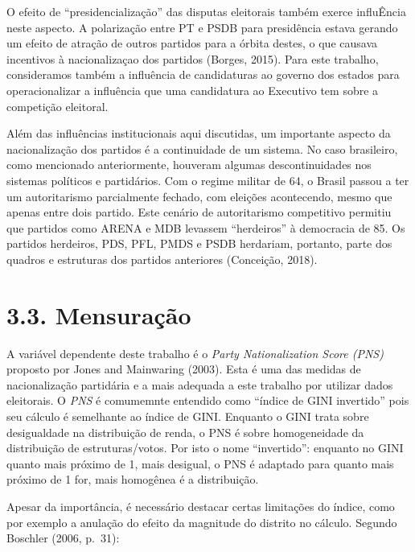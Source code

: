 \documentclass[]{article}
\begin{document}
O efeito de ``presidencialização'' das disputas eleitorais também exerce
influÊncia neste aspecto. A polarização entre PT e PSDB para presidência
estava gerando um efeito de atração de outros partidos para a órbita
destes, o que causava incentivos à nacionalizaçao dos partidos (Borges,
2015). Para este trabalho, consideramos também a influência de
candidaturas ao governo dos estados para operacionalizar a influência
que uma candidatura ao Executivo tem sobre a competição eleitoral.

Além das influências institucionais aqui discutidas, um importante
aspecto da nacionalização dos partidos é a continuidade de um sistema.
No caso brasileiro, como mencionado anteriormente, houveram algumas
descontinuidades nos sistemas políticos e partidários. Com o regime
militar de 64, o Brasil passou a ter um autoritarismo parcialmente
fechado, com eleições acontecendo, mesmo que apenas entre dois partido.
Este cenário de autoritarismo competitivo permitiu que partidos como
ARENA e MDB levassem ``herdeiros'' à democracia de 85. Os partidos
herdeiros, PDS, PFL, PMDS e PSDB herdariam, portanto, parte dos quadros
e estruturas dos partidos anteriores (Conceição, 2018).

\section{3.3. Mensuração}\label{mensuracao}

A variável dependente deste trabalho é o \emph{Party Nationalization
Score (PNS)} proposto por Jones and Mainwaring (2003). Esta é uma das
medidas de nacionalização partidária e a mais adequada a este trabalho
por utilizar dados eleitorais. O \emph{PNS} é comumemnte entendido como
``índice de GINI invertido'' pois seu cálculo é semelhante ao índice de
GINI. Enquanto o GINI trata sobre desigualdade na distribuição de renda,
o PNS é sobre homogeneidade da distribuição de estruturas/votos. Por
isto o nome ``invertido'': enquanto no GINI quanto mais próximo de 1,
mais desigual, o PNS é adaptado para quanto mais próximo de 1 for, mais
homogênea é a distribuição.

Apesar da importância, é necessário destacar certas limitações do
índice, como por exemplo a anulação do efeito da magnitude do distrito
no cálculo. Segundo Boschler (2006, p.~31):
\end{document}
